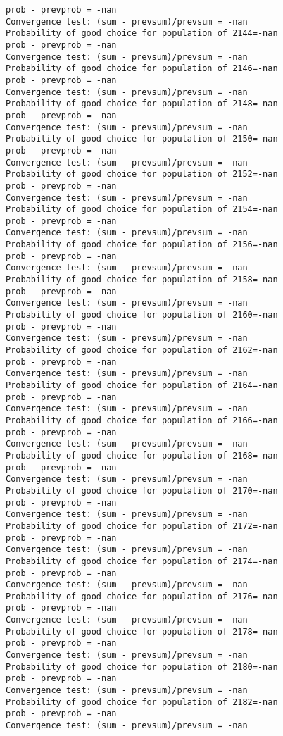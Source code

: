 \documentclass[11pt,onecolumn]{article}
\begin{document}
\begin{verbatim}
prob - prevprob = -nan
Convergence test: (sum - prevsum)/prevsum = -nan
Probability of good choice for population of 2144=-nan
prob - prevprob = -nan
Convergence test: (sum - prevsum)/prevsum = -nan
Probability of good choice for population of 2146=-nan
prob - prevprob = -nan
Convergence test: (sum - prevsum)/prevsum = -nan
Probability of good choice for population of 2148=-nan
prob - prevprob = -nan
Convergence test: (sum - prevsum)/prevsum = -nan
Probability of good choice for population of 2150=-nan
prob - prevprob = -nan
Convergence test: (sum - prevsum)/prevsum = -nan
Probability of good choice for population of 2152=-nan
prob - prevprob = -nan
Convergence test: (sum - prevsum)/prevsum = -nan
Probability of good choice for population of 2154=-nan
prob - prevprob = -nan
Convergence test: (sum - prevsum)/prevsum = -nan
Probability of good choice for population of 2156=-nan
prob - prevprob = -nan
Convergence test: (sum - prevsum)/prevsum = -nan
Probability of good choice for population of 2158=-nan
prob - prevprob = -nan
Convergence test: (sum - prevsum)/prevsum = -nan
Probability of good choice for population of 2160=-nan
prob - prevprob = -nan
Convergence test: (sum - prevsum)/prevsum = -nan
Probability of good choice for population of 2162=-nan
prob - prevprob = -nan
Convergence test: (sum - prevsum)/prevsum = -nan
Probability of good choice for population of 2164=-nan
prob - prevprob = -nan
Convergence test: (sum - prevsum)/prevsum = -nan
Probability of good choice for population of 2166=-nan
prob - prevprob = -nan
Convergence test: (sum - prevsum)/prevsum = -nan
Probability of good choice for population of 2168=-nan
prob - prevprob = -nan
Convergence test: (sum - prevsum)/prevsum = -nan
Probability of good choice for population of 2170=-nan
prob - prevprob = -nan
Convergence test: (sum - prevsum)/prevsum = -nan
Probability of good choice for population of 2172=-nan
prob - prevprob = -nan
Convergence test: (sum - prevsum)/prevsum = -nan
Probability of good choice for population of 2174=-nan
prob - prevprob = -nan
Convergence test: (sum - prevsum)/prevsum = -nan
Probability of good choice for population of 2176=-nan
prob - prevprob = -nan
Convergence test: (sum - prevsum)/prevsum = -nan
Probability of good choice for population of 2178=-nan
prob - prevprob = -nan
Convergence test: (sum - prevsum)/prevsum = -nan
Probability of good choice for population of 2180=-nan
prob - prevprob = -nan
Convergence test: (sum - prevsum)/prevsum = -nan
Probability of good choice for population of 2182=-nan
prob - prevprob = -nan
Convergence test: (sum - prevsum)/prevsum = -nan

\end{verbatim}
\end{document}
